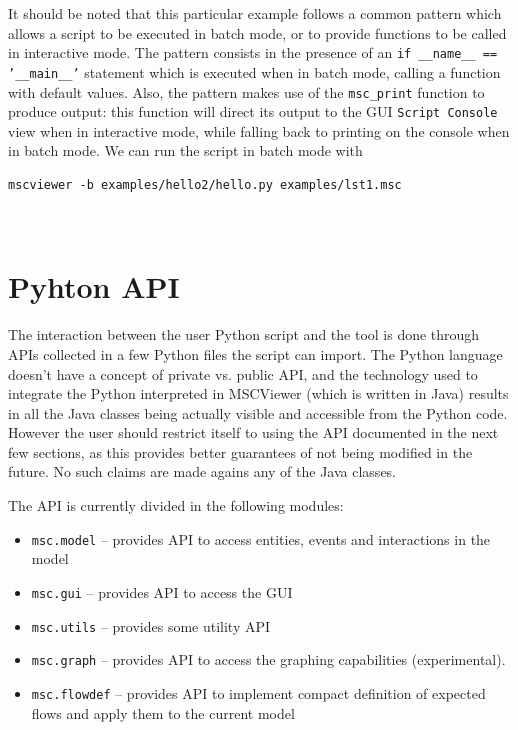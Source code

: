 \documentclass[11pt, twoside, titlepage]{book}
\newcommand{\prog}{MSCViewer}
\begin{document}
It should be noted that this particular example follows a common pattern which allows a script
to be executed in batch mode, or to provide functions to be called in interactive mode. The pattern
consists in the presence of an \texttt{if \_\_name\_\_ == '\_\_main\_\_'} statement which 
is executed when in batch mode, calling a function with default values. Also, the pattern
makes use of the \texttt{msc\_print} function to produce output: this function will direct
its output to the GUI \texttt{Script Console} view when in interactive mode, while 
falling back to printing on the console when in batch mode. We can run the 
script in batch mode with

\begin{verbatim}
mscviewer -b examples/hello2/hello.py examples/lst1.msc
\end{verbatim}


\

\section{Pyhton API}
\label{sec:python-api}

The interaction between the user Python script and the tool is done through APIs 
collected in a few Python files the script can import. The Python language doesn't 
have a concept of private vs. public API, and the technology used to integrate the 
Python interpreted in \prog{} (which is written in Java) results in all the Java 
classes being actually visible and accessible from the Python code. However the 
user should restrict itself to using the API documented in the next few sections,
as this provides better guarantees of not being modified in the future. No such 
claims are made agains any of the Java classes. 

The API is currently divided in the following modules:
\begin{itemize}
\item \texttt{msc.model} -- provides API to access entities, events and interactions in the model
\item \texttt{msc.gui} -- provides API to access the GUI 
\item \texttt{msc.utils} -- provides some utility API 
\item \texttt{msc.graph} -- provides API to access the graphing capabilities (experimental). 
\item \texttt{msc.flowdef} -- provides API to implement compact definition of expected flows and apply them
                              to the current model
\end{itemize}     
                         
\end{document}
